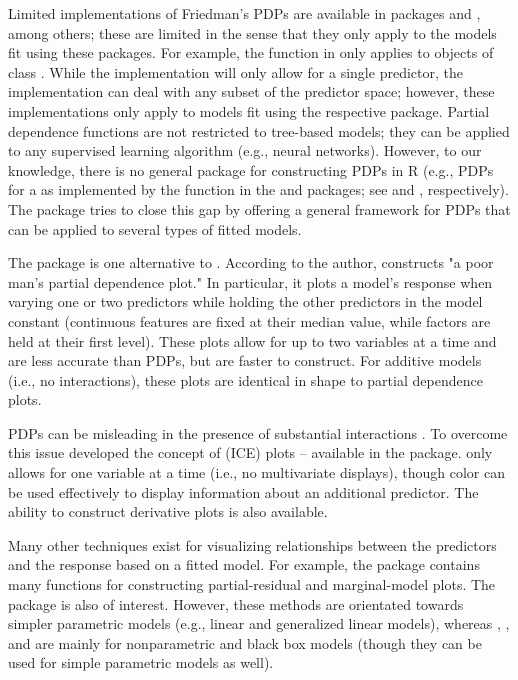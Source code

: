 Limited implementations of Friedman's PDPs are available in packages  \citep{randomForest-pkg} and , among others; these are limited in the sense that they only apply to the models fit using these packages. For example, the  function in  only applies to objects of class . While the  implementation will only allow for a single predictor, the  implementation can deal with any subset of the predictor space; however, these implementations only apply to models fit using the respective package. Partial dependence functions are not restricted to tree-based models; they can be applied to any supervised learning algorithm (e.g., neural networks). However, to our knowledge, there is no general package for constructing PDPs  in R (e.g., PDPs for a  as implemented by the  function in the  and  packages; see \citet{party-pkg} and \citet{partykit-pkg}, respectively). The  \citep{partial-pkg} package tries to close this gap by offering a general framework for PDPs that can be applied to several types of fitted models.

The  package \citep{plotmo-pkg} is one alternative to . According to the author,  constructs "a poor man's partial dependence plot." In particular, it plots a model's response when varying one or two predictors while holding the other predictors in the model constant (continuous features are fixed at their median value, while factors are held at their first level). These plots allow for up to two variables at a time and are less accurate than PDPs, but are faster to construct. For additive models (i.e., no interactions), these plots are identical in shape to partial dependence plots.

PDPs can be misleading in the presence of substantial interactions \citep{goldstein-peeking-2015}. To overcome this issue \citeauthor*{goldstein-peeking-2015} developed the concept of  (ICE) plots -- available in the  package.  only allows for one variable at a time (i.e., no multivariate displays), though color can be used effectively to display information about an additional predictor. The ability to construct derivative plots is also available.

Many other techniques exist for visualizing relationships between the predictors and the response based on a fitted model. For example, the  package \citep{fox-car-2011} contains many functions for constructing partial-residual and marginal-model plots. The  package \citep{fox-effects-2003} is also of interest. However, these methods are orientated towards simpler parametric models (e.g., linear and generalized linear models), whereas , , and  are mainly for nonparametric and black box models (though they can be used for simple parametric models as well).


